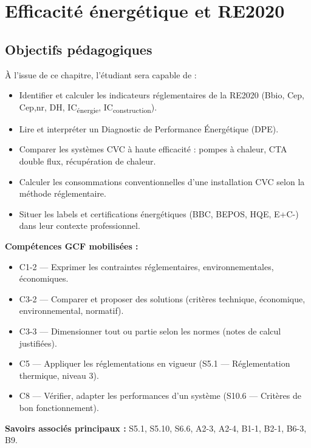 \chapter{Efficacité énergétique et RE2020}

\section{Objectifs pédagogiques}

À l'issue de ce chapitre, l'étudiant sera capable de :

\begin{itemize}
  \item Identifier et calculer les indicateurs réglementaires de la RE2020 (Bbio, Cep, Cep,nr, DH, IC\textsubscript{énergie}, IC\textsubscript{construction}).
  \item Lire et interpréter un Diagnostic de Performance Énergétique (DPE).
  \item Comparer les systèmes CVC à haute efficacité : pompes à chaleur, CTA double flux, récupération de chaleur.
  \item Calculer les consommations conventionnelles d'une installation CVC selon la méthode réglementaire.
  \item Situer les labels et certifications énergétiques (BBC, BEPOS, HQE, E+C-) dans leur contexte professionnel.
\end{itemize}

\medskip
\noindent\textbf{Compétences GCF mobilisées :}
\begin{itemize}
  \item C1-2 — Exprimer les contraintes réglementaires, environnementales, économiques.
  \item C3-2 — Comparer et proposer des solutions (critères technique, économique, environnemental, normatif).
  \item C3-3 — Dimensionner tout ou partie selon les normes (notes de calcul justifiées).
  \item C5 — Appliquer les réglementations en vigueur (S5.1 — Réglementation thermique, niveau 3).
  \item C8 — Vérifier, adapter les performances d'un système (S10.6 — Critères de bon fonctionnement).
\end{itemize}

\medskip
\noindent\textbf{Savoirs associés principaux :} S5.1, S5.10, S6.6, A2-3, A2-4, B1-1, B2-1, B6-3, B9.

